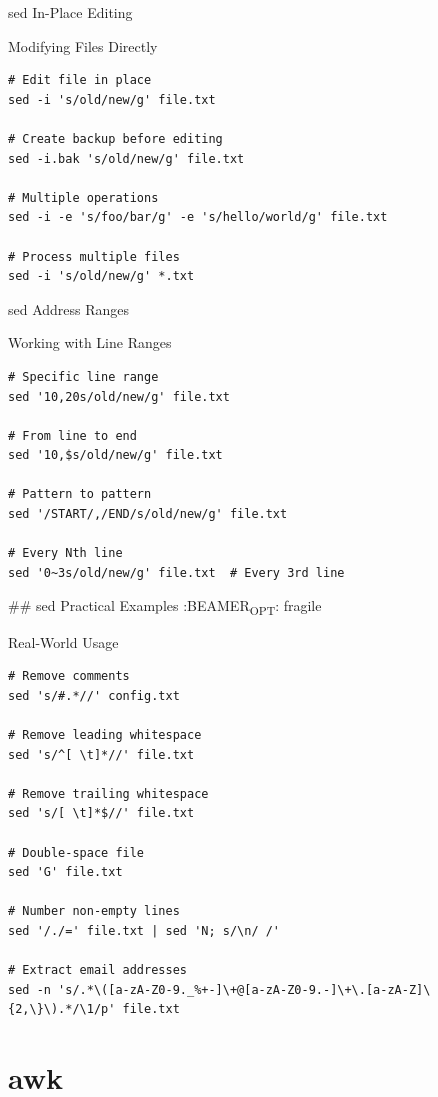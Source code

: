 \documentclass[presentation,aspectratio=1610]{beamer}
\begin{document}
\begin{frame}[label={sec:org30dda09},fragile]{sed In-Place Editing}
 \begin{block}{Modifying Files Directly}
\begin{verbatim}
# Edit file in place
sed -i 's/old/new/g' file.txt

# Create backup before editing
sed -i.bak 's/old/new/g' file.txt

# Multiple operations
sed -i -e 's/foo/bar/g' -e 's/hello/world/g' file.txt

# Process multiple files
sed -i 's/old/new/g' *.txt
\end{verbatim}
\end{block}
\end{frame}
\begin{frame}[label={sec:orgd52eebd},fragile]{sed Address Ranges}
 \begin{block}{Working with Line Ranges}
\begin{verbatim}
# Specific line range
sed '10,20s/old/new/g' file.txt

# From line to end
sed '10,$s/old/new/g' file.txt

# Pattern to pattern
sed '/START/,/END/s/old/new/g' file.txt

# Every Nth line
sed '0~3s/old/new/g' file.txt  # Every 3rd line
\end{verbatim}

\#\# sed Practical Examples
:BEAMER\textsubscript{OPT}: fragile
\end{block}
\begin{block}{Real-World Usage}
\begin{verbatim}
# Remove comments
sed 's/#.*//' config.txt

# Remove leading whitespace
sed 's/^[ \t]*//' file.txt

# Remove trailing whitespace
sed 's/[ \t]*$//' file.txt

# Double-space file
sed 'G' file.txt

# Number non-empty lines
sed '/./=' file.txt | sed 'N; s/\n/ /'

# Extract email addresses
sed -n 's/.*\([a-zA-Z0-9._%+-]\+@[a-zA-Z0-9.-]\+\.[a-zA-Z]\{2,\}\).*/\1/p' file.txt
\end{verbatim}
\end{block}
\end{frame}
\section*{awk}
\label{sec:orgc9b792c}
\end{document}
